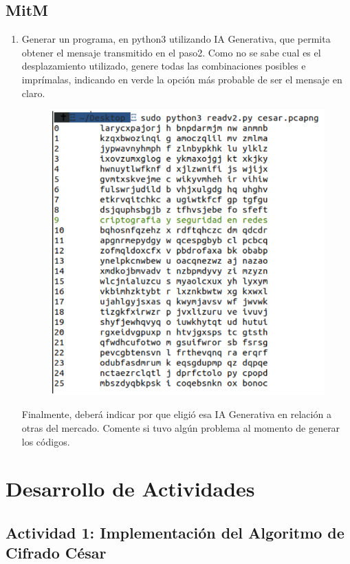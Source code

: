 \documentclass[letter,12pt]{article}
\begin{document}
\subsection{MitM}
\begin{enumerate}
    \item Generar un programa, en python3 utilizando IA Generativa, que permita obtener el mensaje transmitido en el paso2. Como no se sabe cual es el desplazamiento utilizado, genere todas las combinaciones posibles e imprímalas, indicando en verde la opción más probable de ser el mensaje en claro.
    \begin{figure}[H]
        \centering
        \includegraphics[width=12cm]{actividades/A3.png}
        \label{fig:a3}
    \end{figure}
    Finalmente, deberá indicar por que eligió esa IA Generativa en relación a otras del mercado. Comente si tuvo algún problema al momento de generar los códigos.

\end{enumerate}

\section{Desarrollo de Actividades}

\subsection{Actividad 1: Implementación del Algoritmo de Cifrado César}
\end{document}
